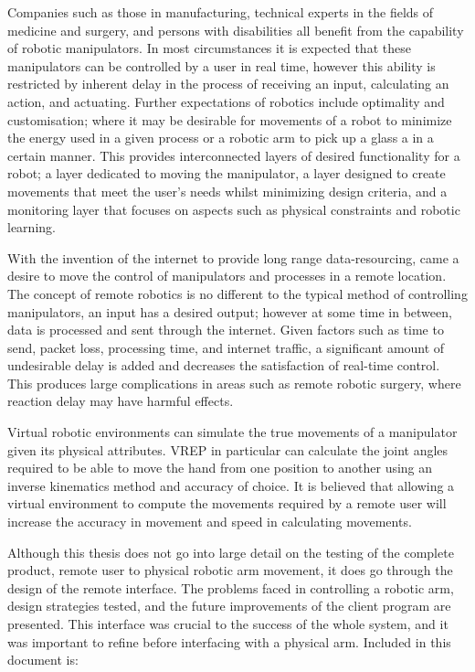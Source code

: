 \documentclass[12pt,openany,a4paper]{book}
\begin{document}
Companies such as those in manufacturing, technical experts in the fields of medicine and surgery, and persons with disabilities all benefit from the capability of robotic manipulators. In most circumstances it is expected that these manipulators can be controlled by a user in real time, however this ability is restricted by inherent delay in the process of receiving an input, calculating an action, and actuating. Further expectations of robotics include optimality and customisation; where it may be desirable for movements of a robot to minimize the energy used in a given process or a robotic arm to pick up a glass a in a certain manner. This provides interconnected layers of desired functionality for a robot; a layer dedicated to moving the manipulator, a layer designed to create movements that meet the user's needs whilst minimizing design criteria, and a monitoring layer that focuses on aspects such as physical constraints and robotic learning.

With the invention of the internet to provide long range data-resourcing, came a desire to move the control of manipulators and processes in a remote location. The concept of remote robotics is no different to the typical method of controlling manipulators, an input has a desired output; however at some time in between, data is processed and sent through the internet. Given factors such as time to send, packet loss, processing time, and internet traffic, a significant amount of undesirable delay is added and decreases the satisfaction of real-time control. This produces large complications in areas such as remote robotic surgery, where reaction delay may have harmful effects.

Virtual robotic environments can simulate the true movements of a manipulator given its physical attributes. VREP in particular can calculate the joint angles required to be able to move the hand from one position to another using an inverse kinematics method and accuracy of choice. It is believed that allowing a virtual environment to compute the movements required by a remote user will increase the accuracy in movement and speed in calculating movements.

Although this thesis does not go into large detail on the testing of the complete product, remote user to physical robotic arm movement, it does go through the design of the remote interface. The problems faced in controlling a robotic arm, design strategies tested, and the future improvements of the client program are presented. This interface was crucial to the success of the whole system, and it was important to refine before interfacing with a physical arm. Included in this document is:
\end{document}
